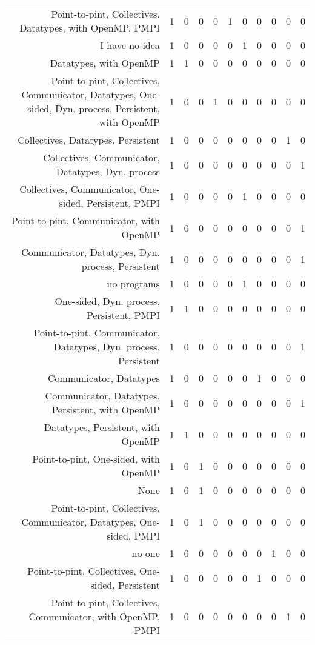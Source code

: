 {\begin{landscape}
\begin{longtable}[htb]{r|c|c|c|c|c|c|c|c|c|c}
{Point-to-pint, Collectives, Datatypes, with OpenMP, PMPI} & 1 & 0 & 0 & 0 & 1 & 0 & 0 & 0 & 0 & 0 \\%
{I have no idea} & 1 & 0 & 0 & 0 & 0 & 1 & 0 & 0 & 0 & 0 \\%
{Datatypes, with OpenMP} & 1 & 1 & 0 & 0 & 0 & 0 & 0 & 0 & 0 & 0 \\%
{Point-to-pint, Collectives, Communicator, Datatypes, One-sided, Dyn. process, Persistent, with OpenMP} & 1 & 0 & 0 & 1 & 0 & 0 & 0 & 0 & 0 & 0 \\%
{Collectives, Datatypes, Persistent} & 1 & 0 & 0 & 0 & 0 & 0 & 0 & 0 & 1 & 0 \\%
{Collectives, Communicator, Datatypes, Dyn. process} & 1 & 0 & 0 & 0 & 0 & 0 & 0 & 0 & 0 & 1 \\%
{Collectives, Communicator, One-sided, Persistent, PMPI} & 1 & 0 & 0 & 0 & 0 & 1 & 0 & 0 & 0 & 0 \\%
{Point-to-pint, Communicator, with OpenMP} & 1 & 0 & 0 & 0 & 0 & 0 & 0 & 0 & 0 & 1 \\%
{Communicator, Datatypes, Dyn. process, Persistent} & 1 & 0 & 0 & 0 & 0 & 0 & 0 & 0 & 0 & 1 \\%
{no programs} & 1 & 0 & 0 & 0 & 0 & 1 & 0 & 0 & 0 & 0 \\%
{One-sided, Dyn. process, Persistent, PMPI} & 1 & 1 & 0 & 0 & 0 & 0 & 0 & 0 & 0 & 0 \\%
{Point-to-pint, Communicator, Datatypes, Dyn. process, Persistent} & 1 & 0 & 0 & 0 & 0 & 0 & 0 & 0 & 0 & 1 \\%
{Communicator, Datatypes} & 1 & 0 & 0 & 0 & 0 & 0 & 1 & 0 & 0 & 0 \\%
{Communicator, Datatypes, Persistent, with OpenMP} & 1 & 0 & 0 & 0 & 0 & 0 & 0 & 0 & 0 & 1 \\%
{Datatypes, Persistent, with OpenMP} & 1 & 1 & 0 & 0 & 0 & 0 & 0 & 0 & 0 & 0 \\%
{Point-to-pint, One-sided, with OpenMP} & 1 & 0 & 1 & 0 & 0 & 0 & 0 & 0 & 0 & 0 \\%
{None} & 1 & 0 & 1 & 0 & 0 & 0 & 0 & 0 & 0 & 0 \\%
{Point-to-pint, Collectives, Communicator, Datatypes, One-sided, PMPI} & 1 & 0 & 1 & 0 & 0 & 0 & 0 & 0 & 0 & 0 \\%
{no one} & 1 & 0 & 0 & 0 & 0 & 0 & 0 & 1 & 0 & 0 \\%
{Point-to-pint, Collectives, One-sided, Persistent} & 1 & 0 & 0 & 0 & 0 & 0 & 1 & 0 & 0 & 0 \\%
{Point-to-pint, Collectives, Communicator, with OpenMP, PMPI} & 1 & 0 & 0 & 0 & 0 & 0 & 0 & 0 & 1 & 0 \\%

\end{longtable}
\end{landscape}}
